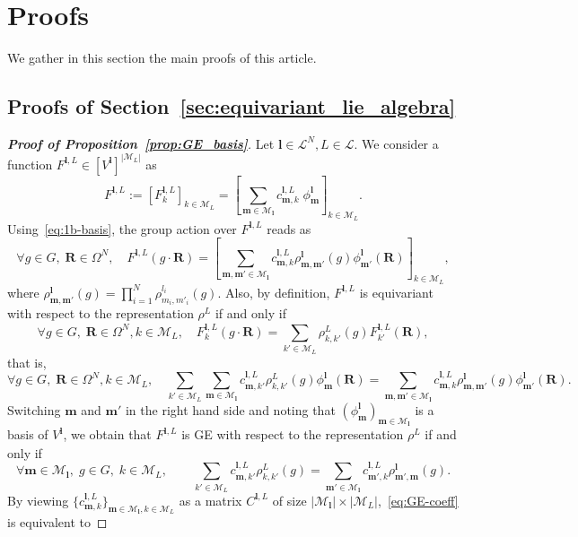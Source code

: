 \documentclass{article}
\newcommand{\rep}[2]{\rho^{#1}_{#2}}
\newcommand{\card}[1]{|{#1}|}
\numberwithin{equation}{section}
\def\bl{{\bm l}}
\def\bbm{{\bm m}}
\def\bR{{\bm R}}
\def\calM{\mathcal{M}}
\def\calL{\mathcal{L}}
\def\Nat{{N}}
\begin{document}
\FloatBarrier
\section{Proofs}
\label{sec:proofs}

We gather in this section the main proofs of this article.

\subsection{Proofs of Section~\ref{sec:equivariant_lie_algebra}}\label{sec:proof_equivariant_lie_algebra}

\begin{proof}[\bf{Proof of Proposition~\ref{prop:GE_basis}}]
Let $\bl\in \calL^N, L\in \calL.$
We consider a function  $F^{\bl,L}\in [V^\bl]^{\card{\calM_L}}$ as 
\[ 
    F^{\bl,L} := \left[ F^{\bl,L}_{k} \right]_{k\in\calM_L}
     = \left[ \sum_{\bbm \in \calM_\bl} c_{\bbm,k}^{\bl,L} \; \phi^\bl_\bbm \right]_{k\in\calM_L}.
\]
Using~\eqref{eq:1b-basis}, the group action over $F^{\bl,L}$ reads as 
\[
   \forall g\in G,\; \bR\in \Omega^\Nat, \quad F^{\bl,L}(g \cdot \bR) =  \left[ \sum_{\bbm,\bbm' \in \calM_\bl} c_{\bbm,k}^{\bl,L} \rep{\bl}{\bbm,\bbm'}(g) \phi^\bl_{\bbm'}(\bR) \right]_{k\in\calM_L},
\]
where $\displaystyle\rep{\bl}{\bbm,\bbm'}(g) = \prod_{i=1}^\Nat \rep{l_i}{m_i,m'_i}(g)$. Also, by definition, $F^{\bl,L}$ is equivariant with respect to the representation $\rep{L}{}$ if and only if
\[
    \forall g\in G,\; \bR\in\Omega^\Nat, k\in \calM_L, 
    \quad F^{\bl,L}_{k}(g \cdot \bR) = \sum_{k'\in\calM_L} \rep{L}{k,k'}(g)F_{k'}^{\bl,L}(\bR),
\]
that is,
\[ 
\forall g\in G,\; \bR\in\Omega^\Nat,  k\in\calM_L,
\quad
   \sum_{k'\in\calM_L} \sum_{\bbm \in \calM_\bl} c_{\bbm,k'}^{\bl,L} \rep{L}{k,k'}(g) \phi^\bl_\bbm(\bR)
   = 
   \sum_{\bbm,\bbm' \in \calM_\bl} c_{\bbm,k}^{\bl,L} \rep{\bl}{\bbm,\bbm'}(g) \phi^\bl_{\bbm'}(\bR).
\]
Switching $\bbm$ and $\bbm'$ in the right hand side and noting that $(\phi^\bl_\bbm)_{\bbm\in \calM_\bl}$ is a basis of $V^\bl$, we obtain that 
$F^{\bl,L}$ is GE with respect to the representation $\rep{L}{}$ if and only if
\begin{equation}\label{eq:GE-coeff}
\forall \bbm \in \calM_\bl,\; g\in G,\; k\in\calM_L, \qquad
     \sum_{k'\in\calM_L}c_{\bbm,k'}^{\bl,L} 
     \rep{L}{k,k'}(g)  
   = \sum_{\bbm' \in \calM_\bl} c_{\bbm',k}^{\bl,L} \rep{\bl}{\bbm',\bbm}(g). 
\end{equation}
By viewing $\{c_{\bbm,k}^{\bl,L}\}_{\bbm\in\mathcal{M}_\bl,k\in\mathcal{M}_L}$ as a matrix $C^{\bl,L}$ of size $\card{\mathcal{M}_\bl}\times\card{\mathcal{M}_L}$,~\eqref{eq:GE-coeff} is equivalent to

\end{proof}
\end{document}
